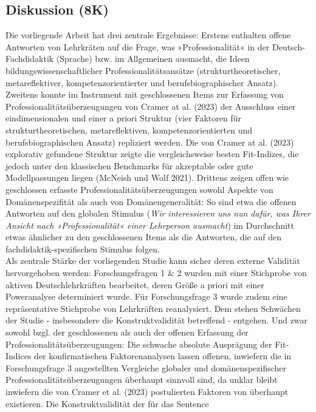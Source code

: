 \documentclass[
  letterpaper,
  DIV=11]{scrartcl}
\begin{document}
\subsection{Diskussion (8K)}\label{diskussion-8k}

Die vorliegende Arbeit hat drei zentrale Ergebnisse: Erstens enthalten
offene Antworten von Lehrkräten auf die Frage, was »Professionalität« in
der Deutsch-Fachdidaktik (Sprache) bzw. im Allgemeinen ausmacht, die
Ideen bildungswissenschaftlicher Professionalitätsansätze
(strukturtheoretischer, metareflektiver, kompetenzorientierter und
berufsbiographischer Ansatz). Zweitens konnte im Instrument mit
geschlossenen Items zur Erfassung von Professionalitätsüberzeugungen von
Cramer at al. (2023) der Ausschluss einer eindimensionalen und einer a
priori Struktur (vier Faktoren für strukturtheoretischen,
metareflektiven, kompetenzorientierten und berufsbiographischen Ansatz)
repliziert werden. Die von Cramer at al. (2023) explorativ gefundene
Struktur zeigte die vergleichsweise besten Fit-Indizes, die jedoch unter
den klassischen Benchmarks für akzeptable oder gute Modellpassungen
liegen (McNeish und Wolf 2021). Drittens zeigen offen wie geschlossen
erfasste Professionalitätsüberzeugungen sowohl Aspekte von
Domänenspezifität als auch von Domänengeneralität: So sind etwa die
offenen Antworten auf den globalen Stimulus (\emph{Wir interessieren uns
nun dafür, was Ihrer Ansicht nach »Professionalität« einer Lehrperson
ausmacht}) im Durchschnitt etwas ähnlicher zu den geschlossenen Items
als die Antworten, die auf den fachdidaktik-spezifischen Stimulus
folgen.\\
Als zentrale Stärke der vorliegenden Studie kann sicher deren externe
Validität hervorgehoben werden: Forschungsfragen 1 \& 2 wurden mit einer
Stichprobe von aktiven Deutschlehrkräften bearbeitet, deren Größe a
priori mit einer Poweranalyse determiniert wurde. Für Forschungsfrage 3
wurde zudem eine repräsentative Stichprobe von Lehrkräften reanalysiert.
Dem stehen Schwächen der Studie - insbesondere die Konstruktvalidität
betreffend - entgehen. Und zwar sowohl bzgl. der geschlossenen als auch
der offenen Erfassung der Professionalitätsüberzeugungen: Die schwache
absolute Ausprägung der Fit-Indices der konfirmatischen Faktorenanalysen
lassen offenen, inwiefern die in Forschungsfrage 3 angestellten
Vergleiche globaler und domänenspezifischer
Professionalitätsüberzeugungen überhaupt sinnvoll sind, da unklar bleibt
inwiefern die von Cramer et al. (2023) postulierten Faktoren von
überhaupt existieren. Die Konstruktvalidität der für das Sentence
\end{document}
